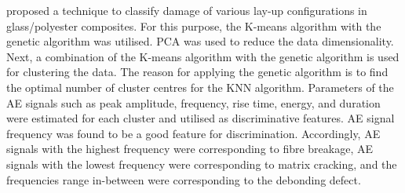 \textcite{Pashmforoush2014} proposed a technique to classify damage of various lay-up configurations in glass/polyester composites.
For this purpose, the K-means algorithm with the genetic algorithm was utilised. 
PCA was used to reduce the data dimensionality.
Next, a combination of the K-means algorithm with the genetic algorithm is used for clustering the data. 
The reason for applying the genetic algorithm is to find the optimal number of cluster centres for the KNN algorithm.
Parameters of the AE signals such as peak amplitude, frequency, rise time, energy, and duration were estimated for each cluster and utilised as discriminative features. 
AE signal frequency was found to be a good feature for discrimination. Accordingly, AE signals with the highest frequency were corresponding to fibre breakage, AE signals with the lowest frequency were corresponding to matrix cracking, and the frequencies range in-between were corresponding to the debonding defect. 
%

